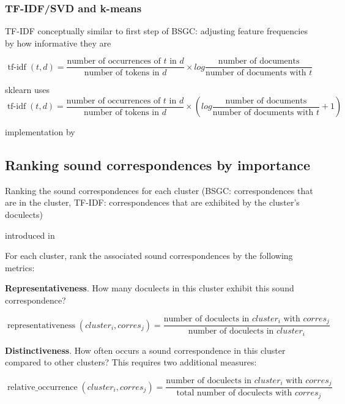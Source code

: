 \documentclass{article}
\begin{document}
\subsubsection{TF-IDF/SVD and k-means}

TF-IDF conceptually similar to first step of BSGC: adjusting feature frequencies by how informative they are

\begin{equation*}
\operatorname{tf-idf}(t, d) =
\frac{\text{number of occurrences of } t \text{ in } d}
{\text{number of tokens in } d}
\times
log
\frac{\text{number of documents}}
{\text{number of documents with } t}
\end{equation*}

sklearn uses 
\begin{equation*}
\operatorname{tf-idf}(t, d) =
\frac{\text{number of occurrences of } t \text{ in } d}
{\text{number of tokens in } d}
\times
(
log
\frac{\text{number of documents}}
{\text{number of documents with } t}
+ 1)
\end{equation*}

implementation by \cite{pedregosa2011scikit-learn:}

\subsection{Ranking sound correspondences by importance}

Ranking the sound correspondences for each cluster
(BSGC: correspondences that are in the cluster,
TF-IDF: correspondences that are exhibited by the cluster's doculects)

introduced in \citet{wieling2011bipartite}

For each cluster, rank the associated sound correspondences by the following metrics:

\textbf{Representativeness}.
How many doculects in this cluster exhibit this sound correspondence?

\begin{equation*}
\operatorname{representativeness}(cluster_i, corres_j) = 
\frac{\text{number of doculects in } cluster_i \text{ with }  corres_j}
{\text{number of doculects in }  cluster_i}
\end{equation*}

\textbf{Distinctiveness}.
How often occurs a sound correspondence in this cluster compared to other clusters? 
This requires two additional measures: 

\begin{equation*}
\operatorname{relative\_occurrence}(cluster_i, corres_j) = 
\frac{\text{number of doculects in } cluster_i \text{ with }  corres_j}
{\text{total number of doculects with } corres_j}
\end{equation*}
\end{document}
